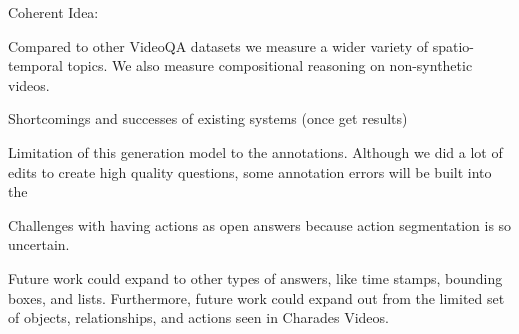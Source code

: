 \documentclass[10pt,twocolumn,letterpaper]{article}
\newcommand{\mgm}[1]{{\color{cyan}{mgm: #1}}}
\begin{document}
Coherent Idea: 

\mgm{A lot of separate ideas here, need to find a coherent flow}

Compared to other VideoQA datasets we measure a wider variety of spatio-temporal topics. We also measure compositional reasoning on non-synthetic videos. 

Shortcomings and successes of existing systems (once get results)

Limitation of this generation model to the annotations. Although we did a lot of edits to create high quality questions, some annotation errors will be built into the 

Challenges with having actions as open answers because action segmentation is so uncertain.

Future work could expand to other types of answers, like time stamps, bounding boxes, and lists. Furthermore, future work could expand out from the limited set of objects, relationships, and actions seen in Charades Videos. 

{\small


}
\end{document}
